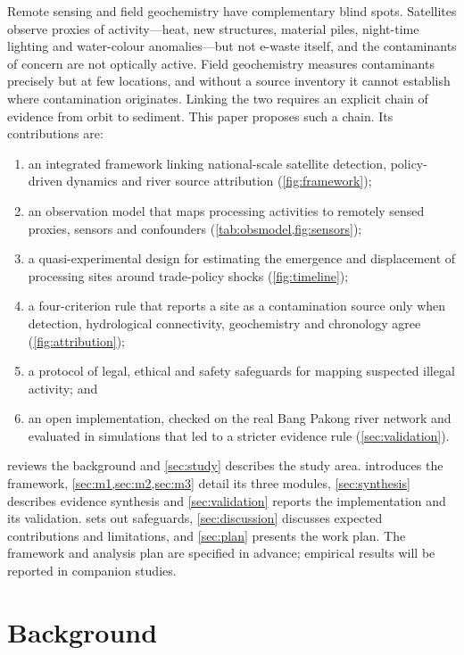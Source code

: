 \documentclass[10pt]{article}
\begin{document}
Remote sensing and field geochemistry have complementary blind spots. Satellites observe proxies of activity---heat, new structures, material piles, night-time lighting and water-colour anomalies---but not e-waste itself, and the contaminants of concern are not optically active. Field geochemistry measures contaminants precisely but at few locations, and without a source inventory it cannot establish where contamination originates. Linking the two requires an explicit chain of evidence from orbit to sediment. This paper proposes such a chain. Its contributions are:
\begin{enumerate}
\item an integrated framework linking national-scale satellite detection, policy-driven dynamics and river source attribution (\cref{fig:framework});
\item an observation model that maps processing activities to remotely sensed proxies, sensors and confounders (\cref{tab:obsmodel,fig:sensors});
\item a quasi-experimental design for estimating the emergence and displacement of processing sites around trade-policy shocks (\cref{fig:timeline});
\item a four-criterion rule that reports a site as a contamination source only when detection, hydrological connectivity, geochemistry and chronology agree (\cref{fig:attribution});
\item a protocol of legal, ethical and safety safeguards for mapping suspected illegal activity; and
\item an open implementation, checked on the real Bang Pakong river network and evaluated in simulations that led to a stricter evidence rule (\cref{sec:validation}).
\end{enumerate}
 reviews the background and \cref{sec:study} describes the study area.  introduces the framework, \cref{sec:m1,sec:m2,sec:m3} detail its three modules, \cref{sec:synthesis} describes evidence synthesis and \cref{sec:validation} reports the implementation and its validation.  sets out safeguards, \cref{sec:discussion} discusses expected contributions and limitations, and \cref{sec:plan} presents the work plan. The framework and analysis plan are specified in advance; empirical results will be reported in companion studies.

\section{Background}\label{sec:background}
\end{document}
